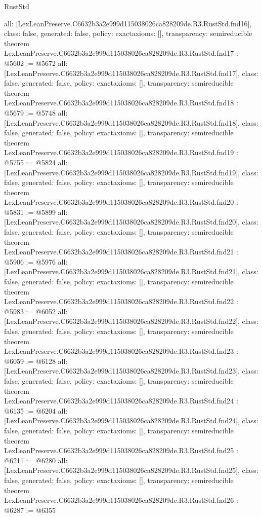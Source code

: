 \begin{lexlean}{RustStd}
\begin{coremodule}
{  all: [LexLeanPreserve.C6632b3a2e999d115038026ca828209de.R3.RustStd.fnd16],
  class: false,
  generated: false,
  policy: exact{axioms: []},
  transparency: semireducible
}
theorem LexLeanPreserve.C6632b3a2e999d115038026ca828209de.R3.RustStd.fnd17 : @5602 := @5672 {
  all: [LexLeanPreserve.C6632b3a2e999d115038026ca828209de.R3.RustStd.fnd17],
  class: false,
  generated: false,
  policy: exact{axioms: []},
  transparency: semireducible
}
theorem LexLeanPreserve.C6632b3a2e999d115038026ca828209de.R3.RustStd.fnd18 : @5679 := @5748 {
  all: [LexLeanPreserve.C6632b3a2e999d115038026ca828209de.R3.RustStd.fnd18],
  class: false,
  generated: false,
  policy: exact{axioms: []},
  transparency: semireducible
}
theorem LexLeanPreserve.C6632b3a2e999d115038026ca828209de.R3.RustStd.fnd19 : @5755 := @5824 {
  all: [LexLeanPreserve.C6632b3a2e999d115038026ca828209de.R3.RustStd.fnd19],
  class: false,
  generated: false,
  policy: exact{axioms: []},
  transparency: semireducible
}
theorem LexLeanPreserve.C6632b3a2e999d115038026ca828209de.R3.RustStd.fnd20 : @5831 := @5899 {
  all: [LexLeanPreserve.C6632b3a2e999d115038026ca828209de.R3.RustStd.fnd20],
  class: false,
  generated: false,
  policy: exact{axioms: []},
  transparency: semireducible
}
theorem LexLeanPreserve.C6632b3a2e999d115038026ca828209de.R3.RustStd.fnd21 : @5906 := @5976 {
  all: [LexLeanPreserve.C6632b3a2e999d115038026ca828209de.R3.RustStd.fnd21],
  class: false,
  generated: false,
  policy: exact{axioms: []},
  transparency: semireducible
}
theorem LexLeanPreserve.C6632b3a2e999d115038026ca828209de.R3.RustStd.fnd22 : @5983 := @6052 {
  all: [LexLeanPreserve.C6632b3a2e999d115038026ca828209de.R3.RustStd.fnd22],
  class: false,
  generated: false,
  policy: exact{axioms: []},
  transparency: semireducible
}
theorem LexLeanPreserve.C6632b3a2e999d115038026ca828209de.R3.RustStd.fnd23 : @6059 := @6128 {
  all: [LexLeanPreserve.C6632b3a2e999d115038026ca828209de.R3.RustStd.fnd23],
  class: false,
  generated: false,
  policy: exact{axioms: []},
  transparency: semireducible
}
theorem LexLeanPreserve.C6632b3a2e999d115038026ca828209de.R3.RustStd.fnd24 : @6135 := @6204 {
  all: [LexLeanPreserve.C6632b3a2e999d115038026ca828209de.R3.RustStd.fnd24],
  class: false,
  generated: false,
  policy: exact{axioms: []},
  transparency: semireducible
}
theorem LexLeanPreserve.C6632b3a2e999d115038026ca828209de.R3.RustStd.fnd25 : @6211 := @6280 {
  all: [LexLeanPreserve.C6632b3a2e999d115038026ca828209de.R3.RustStd.fnd25],
  class: false,
  generated: false,
  policy: exact{axioms: []},
  transparency: semireducible
}
theorem LexLeanPreserve.C6632b3a2e999d115038026ca828209de.R3.RustStd.fnd26 : @6287 := @6355 {
}
\end{coremodule}
\end{lexlean}

